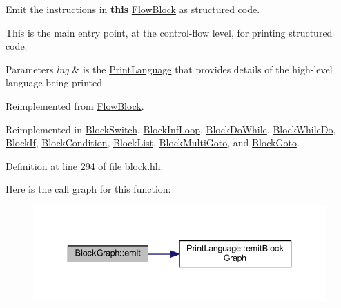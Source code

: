 Emit the instructions in {\bfseries{this}} \mbox{\hyperlink{class_flow_block}{Flow\+Block}} as structured code. 

This is the main entry point, at the control-\/flow level, for printing structured code. 
\begin{DoxyParams}{Parameters}
{\em lng} & is the \mbox{\hyperlink{class_print_language}{Print\+Language}} that provides details of the high-\/level language being printed \\
\hline
\end{DoxyParams}


Reimplemented from \mbox{\hyperlink{class_flow_block_a9baddec2635c95a5ac9019d6b21d3eab}{Flow\+Block}}.



Reimplemented in \mbox{\hyperlink{class_block_switch_ad1102b97e80c4dd7afa66891eb67a0d6}{Block\+Switch}}, \mbox{\hyperlink{class_block_inf_loop_aa86634144acbb9f7b6b580b9f4566bfe}{Block\+Inf\+Loop}}, \mbox{\hyperlink{class_block_do_while_aa3ab4da82b72f8de35ad9de5f5dff9a2}{Block\+Do\+While}}, \mbox{\hyperlink{class_block_while_do_a8596786848701d23bc4e4a7fc3730889}{Block\+While\+Do}}, \mbox{\hyperlink{class_block_if_a81d526be9d8cca137f9008ac7a12d410}{Block\+If}}, \mbox{\hyperlink{class_block_condition_a952361756ea8b84dc0234d00d628c164}{Block\+Condition}}, \mbox{\hyperlink{class_block_list_a391529d850ca5f97c74acee00c080c43}{Block\+List}}, \mbox{\hyperlink{class_block_multi_goto_a8eee38e26a13873ceaff6d37b46eaafd}{Block\+Multi\+Goto}}, and \mbox{\hyperlink{class_block_goto_a0efc3af4b5fda8bf5f04b0fbca784935}{Block\+Goto}}.



Definition at line 294 of file block.\+hh.

Here is the call graph for this function\+:
\nopagebreak
\begin{figure}[H]
\begin{center}
\leavevmode
\includegraphics[width=336pt]{class_block_graph_a535d3c7cb13e5e45b6e121b024fa339f_cgraph}
\end{center}
\end{figure}
\mbox{\label{class_block_graph_ac87b63ceb9f08a4f8667da43e25c7e5e}} 
